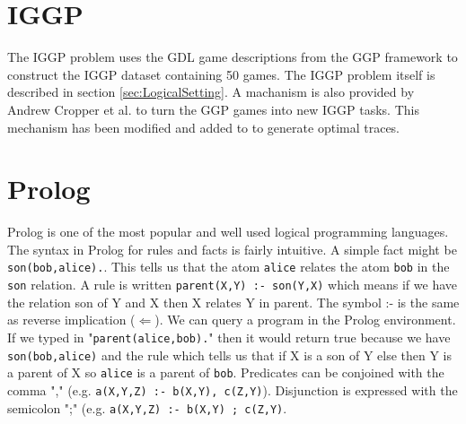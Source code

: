 \documentclass[a4paper,12pt]{report}
\begin{document}
\section{IGGP}
The IGGP problem uses the GDL game descriptions from the GGP framework to construct the IGGP dataset containing 50 games. The IGGP problem itself is described in section \ref{sec:LogicalSetting}. A machanism is also provided by Andrew Cropper et al. \cite{Cropper/IGGP} to turn the GGP games into new IGGP tasks. This mechanism has been modified and added to to generate optimal traces.
\section{Prolog}
Prolog is one of the most popular and well used logical programming languages. The syntax in Prolog for rules and facts is fairly intuitive. A simple fact might be \texttt{son(bob,alice).}. This tells us that the atom \texttt{alice} relates the atom \texttt{bob} in the \texttt{son} relation. A rule is written \texttt{parent(X,Y) :- son(Y,X)} which means if we have the relation son of Y and X then X relates Y in parent. The symbol :- is the same as reverse implication ($\Leftarrow$). We can query a program in the Prolog environment. If we typed in "\texttt{parent(alice,bob).}" then it would return true because we have \texttt{son(bob,alice)} and the rule which tells us that if X is a son of Y else then Y is a parent of X so \texttt{alice} is a parent of \texttt{bob}. Predicates can be conjoined with the comma "," (e.g. \texttt{a(X,Y,Z) :- b(X,Y), c(Z,Y)}). Disjunction is expressed with the semicolon ";" (e.g. \texttt{a(X,Y,Z) :- b(X,Y) ; c(Z,Y)}.
\end{document}
